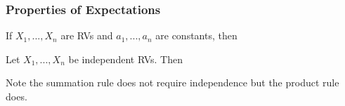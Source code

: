 \subsubsection{Properties of Expectations}

\begin{thm}
    If $X_1, ..., X_n$ are RVs and $a_1, ..., a_n$ are constants, then
\end{thm}
\begin{thm}
    Let $X_1, ..., X_n$ be independent RVs. Then
\end{thm}
Note the summation rule does not require independence but the product rule does.